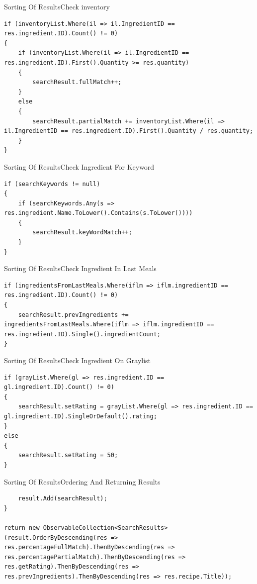\begin{frame}[fragile]{Sorting Of Results}{Check inventory}
\begin{lstlisting}
if (inventoryList.Where(il => il.IngredientID == res.ingredient.ID).Count() != 0)
{
    if (inventoryList.Where(il => il.IngredientID == res.ingredient.ID).First().Quantity >= res.quantity)
    {
        searchResult.fullMatch++;
    }
    else
    {
        searchResult.partialMatch += inventoryList.Where(il => il.IngredientID == res.ingredient.ID).First().Quantity / res.quantity;
    }
}
\end{lstlisting}
\end{frame}

\begin{frame}[fragile]{Sorting Of Results}{Check Ingredient For Keyword}
\begin{lstlisting}
if (searchKeywords != null)
{
    if (searchKeywords.Any(s => res.ingredient.Name.ToLower().Contains(s.ToLower())))
    {
        searchResult.keyWordMatch++;
    }
}
\end{lstlisting}
\end{frame}

\begin{frame}[fragile]{Sorting Of Results}{Check Ingredient In Last Meals}
\begin{lstlisting}
if (ingredientsFromLastMeals.Where(iflm => iflm.ingredientID == res.ingredient.ID).Count() != 0)
{
    searchResult.prevIngredients += ingredientsFromLastMeals.Where(iflm => iflm.ingredientID == res.ingredient.ID).Single().ingredientCount;
}
\end{lstlisting}
\end{frame}

\begin{frame}[fragile]{Sorting Of Results}{Check Ingredient On Graylist}
\begin{lstlisting}
if (grayList.Where(gl => res.ingredient.ID == gl.ingredient.ID).Count() != 0)
{
    searchResult.setRating = grayList.Where(gl => res.ingredient.ID == gl.ingredient.ID).SingleOrDefault().rating;
}
else
{
    searchResult.setRating = 50;
}
\end{lstlisting}
\end{frame}

\begin{frame}[fragile]{Sorting Of Results}{Ordering And Returning Results}
\begin{lstlisting}
    result.Add(searchResult);
}

return new ObservableCollection<SearchResults>(result.OrderByDescending(res => res.percentageFullMatch).ThenByDescending(res => res.percentagePartialMatch).ThenByDescending(res => res.getRating).ThenByDescending(res => res.prevIngredients).ThenByDescending(res => res.recipe.Title));
\end{lstlisting}
\end{frame}




















